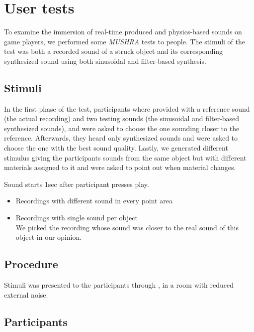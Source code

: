 \section{User tests}

To examine the immersion of real-time produced and physics-based sounds on game players, we performed some \textit{MUSHRA} tests to people. The stimuli of the test was both a recorded sound of a struck object and its corresponding synthesized sound using both sinusoidal and filter-based synthesis.

\subsection{Stimuli}
In the first phase of the test, participants where provided with a reference sound (the actual recording) and two testing sounds (the sinusoidal and filter-based synthesized sounds), and were asked to choose the one sounding closer to the reference. Afterwards, they heard only synthesized sounds and were asked to choose the one with the best sound quality. Lastly, we generated different stimulus giving the participants sounds from the same object but with different materials assigned to it and were asked to point out when material changes. 


Sound starts 1sec after participant presses play.
\begin{itemize}
\item Recordings with different sound in every point area
\item Recordings with single sound per object\\
We picked the recording whose sound was closer to the real sound of this object in our opinion.\\

\end{itemize}

\subsection{Procedure}
Stimuli was presented to the participants through , in a room with reduced external noise.

\subsection{Participants}
